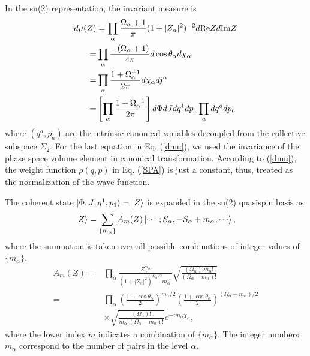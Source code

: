 \documentclass[%
superscriptaddress,
showpacs,
nofootinbib,
amsmath,amssymb,
aps,
prc,
twocolumn,
floatfix ]%
{revtex4-1}
\begin{document}
In the su(2) representation, the invariant measure is
\begin{align}
  d\mu(Z) &= \prod_\alpha \frac{\Omega_\alpha+1}{\pi} (1+|Z_\alpha|^2)^{-2} d{\rm Re}Z d{\rm Im}Z \nonumber \\
=& \prod_\alpha \frac{-(\Omega_\alpha+1)}{4\pi} d \cos{\theta_\alpha} d\chi_\alpha \nonumber \\
 =& \prod_\alpha \frac{1+\Omega_\alpha^{-1}}{2\pi} d\chi_\alpha dj^\alpha \nonumber \\
 =& \left[ \prod_\alpha \frac{1+\Omega_\alpha^{-1}}{2\pi} \right] d\Phi dJ dq^1 dp_1 %
  \prod_a dq^a dp_a
	\label{dmu}
\end{align}
where $(q^a,p_a)$ are the intrinsic canonical variables
decoupled from the collective subspace $\Sigma_2$.
For the last equation in Eq. (\ref{dmu}),
we used the invariance of the phase space volume element
in canonical transformation.
According to (\ref{dmu}),
the weight function $\rho(q,p)$ in Eq. (\ref{SPA}) is just a constant,
thus, treated as the normalization of the wave function.

The coherent state $\ket{\Phi,J;q^1,p_1}=\ket{Z}$ is
expanded in the su(2) quasispin basis as
\begin{align}
\ket{Z} &= 
\sum_{\{m_\alpha\}} A_m(Z) \ket{\cdots;S_\alpha,-S_\alpha+m_\alpha,\cdots}, \nonumber\\
\end{align}
where the summation is taken over all possible combinations
of integer values of $\{ m_\alpha\}$.
\begin{align}
A_m(Z) =& \prod_\alpha 
\frac{Z_\alpha^{m_\alpha}}
	{\left(1+|Z_\alpha|^2\right)^{\Omega_\alpha/2}m_\alpha!}
\sqrt{\frac{(\Omega_\alpha)! m_\alpha!}{(\Omega_\alpha-m_\alpha)!}} \nonumber\\
 =& \prod_\alpha \left(\frac{1-\cos{\theta}_\alpha}{2}\right)^{m_\alpha/2}\left(\frac{1+\cos{\theta}_\alpha}{2}\right)^{(\Omega_\alpha-m_\alpha)/2}
  \nonumber \\
  &\times\sqrt{\frac{(\Omega_\alpha)!}{m_\alpha!(\Omega_\alpha-m_\alpha)!}} e^{-i m_\alpha\chi_\alpha}  ,
	\label{A_m}
\end{align}
where the lower index $m$ indicates a combination of $\{ m_\alpha \}$.
The integer numbers $m_\alpha$ correspond to the number of pairs
in the level $\alpha$.
%
\end{document}
